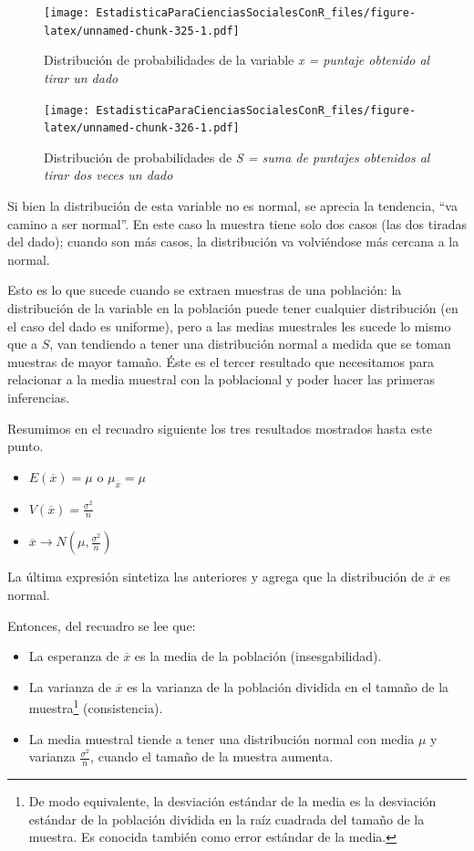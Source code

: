 \documentclass[]{book}
\providecommand{\tightlist}{%
  \setlength{\itemsep}{0pt}\setlength{\parskip}{0pt}}
\let\rmarkdownfootnote\footnote%
\def\footnote{\protect\rmarkdownfootnote}
\begin{document}
\begin{figure}
\centering
\texttt{[image: EstadisticaParaCienciasSocialesConR\_files/figure-latex/unnamed-chunk-325-1.pdf]}
\caption{\label{fig:unnamed-chunk-325}Distribución de probabilidades de la variable \emph{x = puntaje obtenido al tirar un dado}}
\end{figure}

\begin{figure}
\centering
\texttt{[image: EstadisticaParaCienciasSocialesConR\_files/figure-latex/unnamed-chunk-326-1.pdf]}
\caption{\label{fig:unnamed-chunk-326}Distribución de probabilidades de \emph{S = suma de puntajes obtenidos al tirar dos veces un dado}}
\end{figure}

Si bien la distribución de esta variable no es normal, se aprecia la
tendencia, ``va camino a ser normal''. En este caso la muestra tiene solo
dos casos (las dos tiradas del dado); cuando son más casos, la
distribución va volviéndose más cercana a la normal.

Esto es lo que sucede cuando se extraen muestras de una población: la
distribución de la variable en la población puede tener cualquier
distribución (en el caso del dado es uniforme), pero a las medias
muestrales les sucede lo mismo que a \(S\), van tendiendo a tener una
distribución normal a medida que se toman muestras de mayor tamaño. Éste
es el tercer resultado que necesitamos para relacionar a la media
muestral con la poblacional y poder hacer las primeras inferencias.

Resumimos en el recuadro siguiente los tres resultados mostrados hasta
este punto.

\begin{itemize}
\tightlist
\item
  \(E(\overline{x})=\mu\) o \(\mu_{\overline{x}}=\mu\)
\item
  \(V(\overline{x})=\frac{\sigma^2}{n}\)
\item
  \(\overline{x} \rightarrow N(\mu, \frac{\sigma^2}{n})\)
\end{itemize}

La última expresión sintetiza las anteriores y agrega que la
distribución de \(\overline{x}\) es normal.

Entonces, del recuadro se lee que:

\begin{itemize}
\item
  La esperanza de \(\overline{x}\) es la media de la población
  (insesgabilidad).
\item
  La varianza de \(\overline{x}\) es la varianza de la población
  dividida en el tamaño de la muestra\footnote{De modo equivalente, la desviación estándar de la media es la desviación estándar de la población dividida en la raíz cuadrada del tamaño de la muestra. Es conocida también como error estándar de la media.} (consistencia).
\item
  La media muestral tiende a tener una distribución normal con media \(\mu\) y varianza \(\frac{\sigma^{2}}{n}\), cuando el tamaño de la muestra
  aumenta.
\end{itemize}
\end{document}

